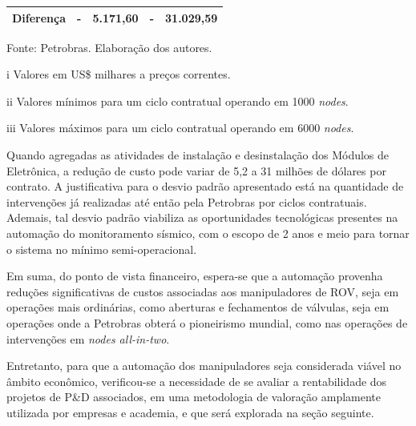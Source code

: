 \begin{table}[h]
{\begin{threeparttable}
\begin{tabular}{lllll}
			\textbf{Diferença}                            & \textbf{-}                                                                                     & \textbf{5.171,60}                                                                                  & \textbf{-}                                                                                     & \textbf{31.029,59}                                                                                 \\ \hline
		\end{tabular}%
		\begin{tablenotes}
			\item Fonte: Petrobras. Elaboração dos autores.
			\item [i]Valores em US\$ milhares a preços correntes.
			\item [ii]Valores mínimos para um ciclo contratual operando em 1000 \textit{nodes}.
			\item [iii]Valores máximos para um ciclo contratual operando em 6000 \textit{nodes}.
		\end{tablenotes}
	\end{threeparttable}
	}
\end{table}

Quando agregadas as atividades de instalação e desinstalação dos Módulos de Eletrônica, a redução de custo pode variar de 5,2 a 31 milhões de dólares por contrato. A justificativa para o desvio padrão apresentado está na quantidade de intervenções já realizadas até então pela Petrobras por ciclos contratuais. Ademais, tal desvio padrão viabiliza as oportunidades tecnológicas presentes na automação do monitoramento sísmico, com o escopo de 2 anos e meio para tornar o sistema no mínimo semi-operacional.

Em suma, do ponto de vista financeiro, espera-se que a automação provenha reduções significativas de custos associadas aos manipuladores de ROV, seja em operações mais ordinárias, como aberturas e fechamentos de válvulas, seja em operações onde a Petrobras obterá o pioneirismo mundial, como nas operações de intervenções em \textit{nodes all-in-two}. 

Entretanto, para que a automação dos manipuladores seja considerada viável no âmbito econômico, verificou-se a necessidade de se avaliar a rentabilidade dos projetos de P\&D associados, em uma metodologia de valoração amplamente utilizada por empresas e academia, e que será explorada na seção seguinte. 


